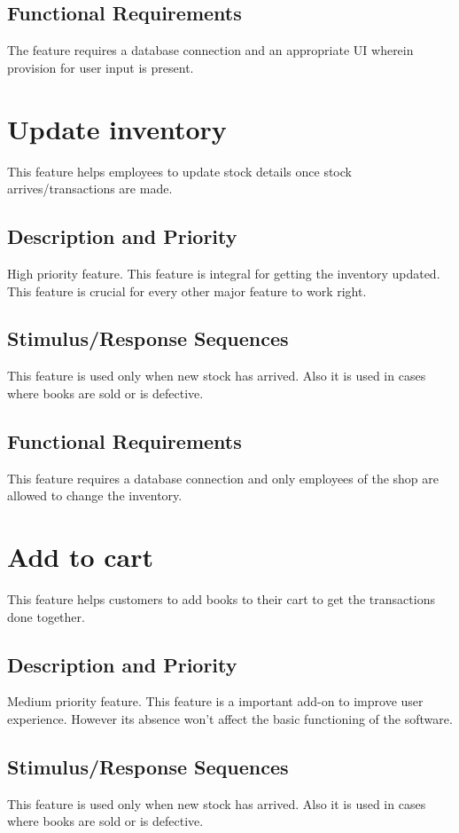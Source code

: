 \documentclass{scrreprt}
\begin{document}
\subsection{Functional Requirements}
The feature requires a database connection and an appropriate  UI wherein provision for user input is present.

\section{Update inventory}

This feature helps employees to update stock details once stock arrives/transactions are made. 
\subsection{Description and Priority}
High priority feature. This feature is integral for getting the inventory updated. This feature is crucial for every other major feature to work right.

\subsection{Stimulus/Response Sequences}
This feature is used only when new stock has arrived. Also it is used in cases where books are sold or is defective.

\subsection{Functional Requirements}
This feature requires a database connection and only employees of the shop are allowed to change the inventory.

\section{Add to cart}

This feature helps customers to add books to their cart to get the transactions done together.
\subsection{Description and Priority}
Medium priority feature. This feature is a important add-on to improve user experience. However its absence won't affect the basic functioning of the software.

\subsection{Stimulus/Response Sequences}
This feature is used only when new stock has arrived. Also it is used in cases where books are sold or is defective.
\end{document}
